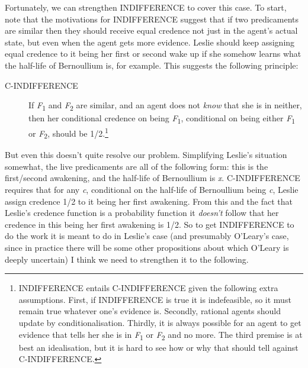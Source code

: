 Fortunately, we can strengthen INDIFFERENCE to cover this case. To start, note that the motivations for INDIFFERENCE suggest that if two predicaments are similar then they should receive equal credence not just in the agent's actual state, but even when the agent gets more evidence. Leslie should keep assigning equal credence to it being her first or second wake up if she somehow learns what the half-life of Bernoullium is, for example. This suggests the following principle:

\begin{description}
\item[C-INDIFFERENCE] If \textit{F}\textsubscript{1 }and \textit{F}\textsubscript{2} are similar, and an agent does not \textit{know} that she is in neither, then her conditional credence on being \textit{F}\textsubscript{1}, conditional on being either \textit{F}\textsubscript{1} or \textit{F}\textsubscript{2}, should be 1/2.\footnote{INDIFFERENCE entails C\nobreakdash-INDIFFERENCE given the following extra assumptions. First, if INDIFFERENCE is true it is indefeasible, so it must remain true whatever one's evidence is. Secondly, rational agents should update by conditionalisation. Thirdly, it is always possible for an agent to get evidence that tells her she is in \textit{F}\textsubscript{1} or \textit{F}\textsubscript{2} and no more. The third premise is at best an idealisation, but it is hard to see how or why that should tell against C\nobreakdash-INDIFFERENCE. }
\end{description}

\noindent But even this doesn't quite resolve our problem. Simplifying Leslie's situation somewhat, the live predicaments are all of the following form: this is the first/second awakening, and the half-life of Bernoullium is \textit{x}. C-INDIFFERENCE requires that for any \textit{c}, conditional on the half-life of Bernoullium being \textit{c}, Leslie assign credence 1/2 to it being her first awakening. From this and the fact that Leslie's credence function is a probability function it \textit{doesn't} follow that her credence in this being her first awakening is 1/2. So to get INDIFFERENCE to do the work it is meant to do in Leslie's case (and presumably O'Leary's case, since in practice there will be some other propositions about which O'Leary is deeply uncertain) I think we need to strengthen it to the following. 


